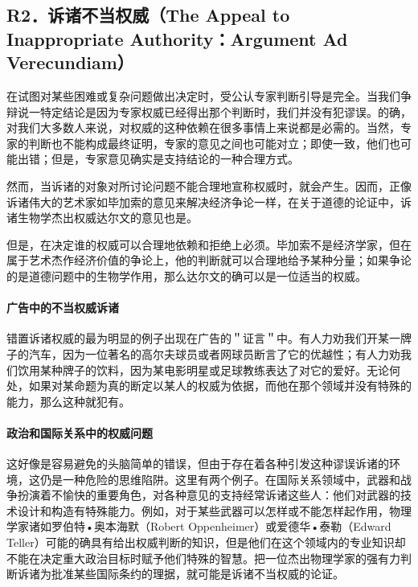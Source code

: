 \subsection{R2．诉诸不当权威（The Appeal to Inappropriate Authority：Argument Ad Verecundiam）}

在试图对某些困难或复杂问题做出决定时，受公认专家判断引导是完全。当我们争辩说一特定结论是因为专家权威已经得出那个判断时，我们并没有犯谬误。的确，对我们大多数人来说，对权威的这种依赖在很多事情上来说都是必需的。当然，专家的判断也不能构成最终证明，专家的意见之间也可能对立；即使一致，他们也可能出错；但是，专家意见确实是支持结论的一种合理方式。

\begin{theorembox}[title=诉诸不当权威谬误的定义]
然而，当诉诸的对象对所讨论问题不能合理地宣称权威时，就会产生。因而，正像诉诸伟大的艺术家如毕加索的意见来解决经济争论一样，在关于道德的论证中，诉诸生物学杰出权威达尔文的意见也是。
\end{theorembox}

但是，在决定谁的权威可以合理地依赖和拒绝上必须。毕加索不是经济学家，但在属于艺术杰作经济价值的争论上，他的判断就可以合理地给予某种分量；如果争论的是道德问题中的生物学作用，那么达尔文的确可以是一位适当的权威。

\paragraph{广告中的不当权威诉诸}
\begin{examplebox}[title=广告中的不当权威诉诸]
错置诉诸权威的最为明显的例子出现在广告的＂证言＂中。有人力劝我们开某一牌子的汽车，因为一位著名的高尔夫球员或者网球员断言了它的优越性；有人力劝我们饮用某种牌子的饮料，因为某电影明星或足球教练表达了对它的爱好。无论何处，如果对某命题为真的断定以某人的权威为依据，而他在那个领域并没有特殊的能力，那么这种就犯有。
\end{examplebox}

\paragraph{政治和国际关系中的权威问题}
这好像是容易避免的头脑简单的错误，但由于存在着各种引发这种谬误诉诸的环境，这仍是一种危险的思维陷阱。这里有两个例子。在国际关系领域中，武器和战争扮演着不愉快的重要角色，对各种意见的支持经常诉诸这些人：他们对武器的技术设计和构造有特殊能力。例如，对于某些武器可以怎样或不能怎样起作用，物理学家诸如罗伯特•奥本海默（Robert Oppenheimer）或爱德华•泰勒（Edward Teller）可能的确具有给出权威判断的知识，但是他们在这个领域内的专业知识却不能在决定重大政治目标时赋予他们特殊的智慧。把一位杰出物理学家的强有力判断诉诸为批准某些国际条约的理据，就可能是诉诸不当权威的论证。

